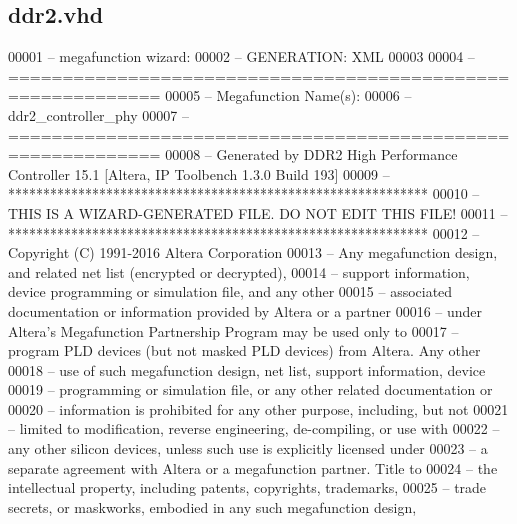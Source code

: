 \subsection{ddr2.\+vhd}
\label{ddr2_8vhd_source}

\begin{DoxyCode}
00001 \textcolor{keyword}{-- megafunction wizard: %
00002 \textcolor{keyword}{-- GENERATION: XML}
00003 
00004 \textcolor{keyword}{-- ============================================================}
00005 \textcolor{keyword}{-- Megafunction Name(s):}
00006 \textcolor{keyword}{--          ddr2\_controller\_phy}
00007 \textcolor{keyword}{-- ============================================================}
00008 \textcolor{keyword}{-- Generated by DDR2 High Performance Controller 15.1 [Altera, IP Toolbench 1.3.0 Build 193]}
00009 \textcolor{keyword}{-- ************************************************************}
00010 \textcolor{keyword}{-- THIS IS A WIZARD-GENERATED FILE. DO NOT EDIT THIS FILE!}
00011 \textcolor{keyword}{-- ************************************************************}
00012 \textcolor{keyword}{-- Copyright (C) 1991-2016 Altera Corporation}
00013 \textcolor{keyword}{-- Any megafunction design, and related net list (encrypted or decrypted),}
00014 \textcolor{keyword}{-- support information, device programming or simulation file, and any other}
00015 \textcolor{keyword}{-- associated documentation or information provided by Altera or a partner}
00016 \textcolor{keyword}{-- under Altera's Megafunction Partnership Program may be used only to}
00017 \textcolor{keyword}{-- program PLD devices (but not masked PLD devices) from Altera.  Any other}
00018 \textcolor{keyword}{-- use of such megafunction design, net list, support information, device}
00019 \textcolor{keyword}{-- programming or simulation file, or any other related documentation or}
00020 \textcolor{keyword}{-- information is prohibited for any other purpose, including, but not}
00021 \textcolor{keyword}{-- limited to modification, reverse engineering, de-compiling, or use with}
00022 \textcolor{keyword}{-- any other silicon devices, unless such use is explicitly licensed under}
00023 \textcolor{keyword}{-- a separate agreement with Altera or a megafunction partner.  Title to}
00024 \textcolor{keyword}{-- the intellectual property, including patents, copyrights, trademarks,}
00025 \textcolor{keyword}{-- trade secrets, or maskworks, embodied in any such megafunction design,}
}
\end{DoxyCode}
